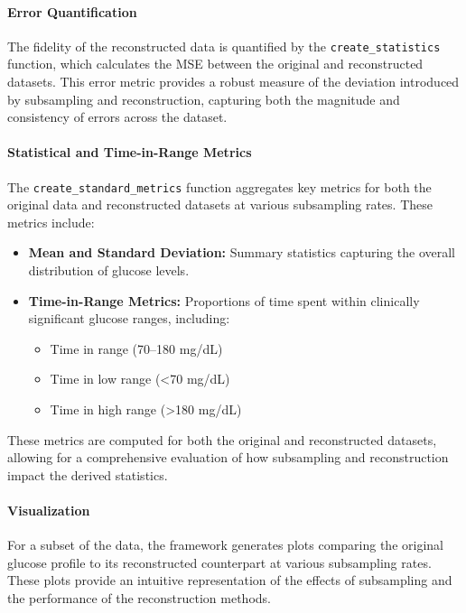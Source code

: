 \paragraph{Error Quantification}
The fidelity of the reconstructed data is quantified by the \texttt{create\_statistics} function, which calculates the MSE between the original and reconstructed datasets. This error metric provides a robust measure of the deviation introduced by subsampling and reconstruction, capturing both the magnitude and consistency of errors across the dataset.

\paragraph{Statistical and Time-in-Range Metrics}
The \texttt{create\_standard\_metrics} function aggregates key metrics for both the original data and reconstructed datasets at various subsampling rates. These metrics include:
\begin{itemize}
	\item \textbf{Mean and Standard Deviation:} Summary statistics capturing the overall distribution of glucose levels.
	\item \textbf{Time-in-Range Metrics:} Proportions of time spent within clinically significant glucose ranges, including:
	\begin{itemize}
		\item Time in range (70–180 mg/dL)
		\item Time in low range (<70 mg/dL)
		\item Time in high range (>180 mg/dL)
	\end{itemize}
\end{itemize}
These metrics are computed for both the original and reconstructed datasets, allowing for a comprehensive evaluation of how subsampling and reconstruction impact the derived statistics.

\paragraph{Visualization}
For a subset of the data, the framework generates plots comparing the original glucose profile to its reconstructed counterpart at various subsampling rates. These plots provide an intuitive representation of the effects of subsampling and the performance of the reconstruction methods.


